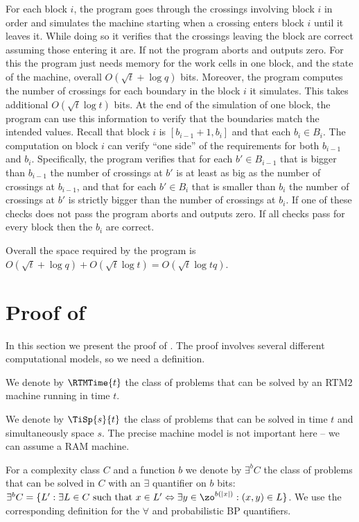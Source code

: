 For each block $i$, the program goes through the crossings involving
block $i$ in order and simulates the machine starting when a crossing
enters block $i$ until it leaves it. While doing so it verifies that
the crossings leaving the block are correct assuming those entering
it are. If not the program aborts and outputs zero. For this the program
just needs memory for the work cells in one block, and the state of
the machine, overall $O(\sqrt{t}+\log q)$ bits. Moreover, the program
computes the number of crossings for each boundary in the block $i$
it simulates. This takes additional $O(\sqrt{t}\log t)$ bits. At
the end of the simulation of one block, the program can use this information
to verify that the boundaries match the intended values. Recall that
block $i$ is $[b_{i-1}+1,b_{i}]$ and that each $b_{i}\in B_{i}$.
The computation on block $i$ can verify ``one side'' of the requirements
for both $b_{i-1}$ and $b_{i}$. Specifically, the program verifies
that for each $b'\in B_{i-1}$ that is bigger than $b_{i-1}$ the
number of crossings at $b'$ is at least as big as the number of crossings
at $b_{i-1}$, and that for each $b'\in B_{i}$ that is smaller than
$b_{i}$ the number of crossings at $b'$ is strictly bigger than
the number of crossings at $b_{i}$. If one of these checks does not
pass the program aborts and outputs zero. If all checks pass for every
block then the $b_{i}$ are correct.

Overall the space required by the program is $O(\sqrt{t}+\log q)+O(\sqrt{t}\log t)=O(\sqrt{t}\log tq)$.

\section{Proof of  \label{sec:Proof-of-lower-bound}}
%

In this section we present the proof of .
The proof involves several different computational models, so we need
a definition.
\begin{defn}
We denote by $\RTMTime{t}$ the class of problems that can be solved
by an RTM2 machine running in time $t$.

We denote by $\TiSp{s}{t}$ the class of problems that can be solved
in time $t$ and simultaneously space $s$. The precise machine model
is not important here -- we can assume a RAM machine.

For a complexity class $C$ and a function $b$ we denote by $\exists^{b}C$
the class of problems that can be solved in $C$ with an $\exists$
quantifier on $b$ bits: $\exists^{b}C=\{L':\exists L\in C\text{ such that }x\in L'\Leftrightarrow\exists y\in\zo^{b(|x|)}:(x,y)\in L\}$.
We use the corresponding definition for the $\forall$ and probabilistic
BP quantifiers.
\end{defn}

